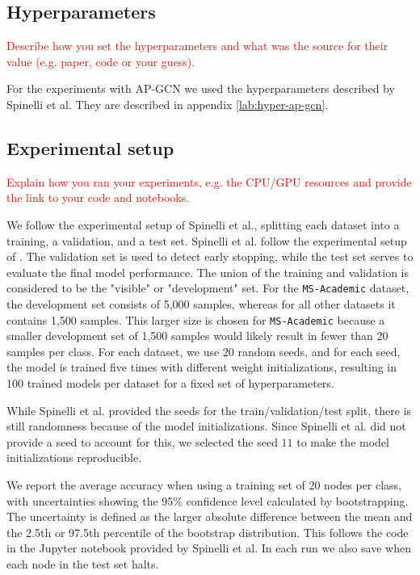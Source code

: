 \documentclass{gdl}
\begin{document}
\subsection{Hyperparameters}
\textcolor{red}{Describe how you set the hyperparameters and what was the source for their value (e.g. paper, code or your guess). }

For the experiments with AP-GCN we used the hyperparameters described by Spinelli et al. They are described in appendix \ref{lab:hyper-ap-gcn}.

\subsection{Experimental setup}
\textcolor{red}{Explain how you ran your experiments, e.g. the CPU/GPU resources and provide the link to your code and notebooks.}

We follow the experimental setup of Spinelli et al., splitting each dataset into a training, a validation, and a test set. Spinelli et al. follow the experimental setup of \cite{}. The validation set is used to detect early stopping, while the test set serves to evaluate the final model performance. The union of the training and validation is considered to be the "visible" or "development" set. For the \texttt{MS-Academic} dataset, the development set consists of 5,000 samples, whereas for all other datasets it contains 1,500 samples. This larger size is chosen for \texttt{MS-Academic} because a smaller development set of 1,500 samples would likely result in fewer than 20 samples per class. For each dataset, we use 20 random seeds, and for each seed, the model is trained five times with different weight initializations, resulting in 100 trained models per dataset for a fixed set of hyperparameters.

While Spinelli et al. provided the seeds for the train/validation/test split, there is still randomness because of the model initializations. Since Spinelli et al. did not provide a seed to account for this, we selected the seed $11$ to make the model initializations reproducible. 

We report the average accuracy when using a training set of 20 nodes per class, with uncertainties showing the 95\% confidence level calculated by bootstrapping. The uncertainty is defined as the larger absolute difference between the mean and the 2.5th or 97.5th percentile of the bootstrap distribution. This follows the code in the Jupyter notebook provided by Spinelli et al. In each run we also save when each node in the test set halts.
\end{document}
